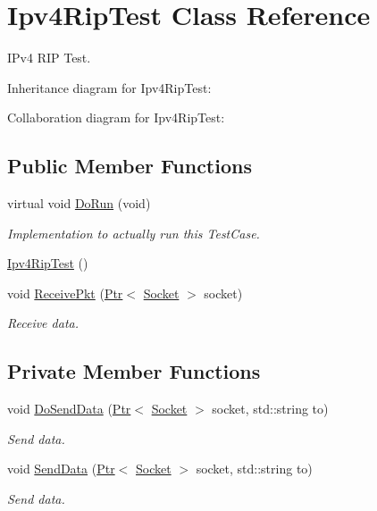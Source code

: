 \hypertarget{classIpv4RipTest}{}\section{Ipv4\+Rip\+Test Class Reference}
\label{classIpv4RipTest}


I\+Pv4 R\+IP Test.  




Inheritance diagram for Ipv4\+Rip\+Test\+:


Collaboration diagram for Ipv4\+Rip\+Test\+:
\subsection*{Public Member Functions}
\begin{DoxyCompactItemize}
\item 
virtual void \hyperlink{classIpv4RipTest_a4f355233f8793da9555cd544cd5893e9}{Do\+Run} (void)
\begin{DoxyCompactList}\small\item\em Implementation to actually run this Test\+Case. \end{DoxyCompactList}\item 
\hyperlink{classIpv4RipTest_a367e000c5525d4a858a52edfba893ebc}{Ipv4\+Rip\+Test} ()
\item 
void \hyperlink{classIpv4RipTest_a1675460149afb06855b867ff17f4a2a4}{Receive\+Pkt} (\hyperlink{classns3_1_1Ptr}{Ptr}$<$ \hyperlink{classns3_1_1Socket}{Socket} $>$ socket)
\begin{DoxyCompactList}\small\item\em Receive data. \end{DoxyCompactList}\end{DoxyCompactItemize}
\subsection*{Private Member Functions}
\begin{DoxyCompactItemize}
\item 
void \hyperlink{classIpv4RipTest_af38195cc9083fa17f5c25382bb42ce98}{Do\+Send\+Data} (\hyperlink{classns3_1_1Ptr}{Ptr}$<$ \hyperlink{classns3_1_1Socket}{Socket} $>$ socket, std\+::string to)
\begin{DoxyCompactList}\small\item\em Send data. \end{DoxyCompactList}\item 
void \hyperlink{classIpv4RipTest_a1542779d9b423f90f5d5adc7c91e28ba}{Send\+Data} (\hyperlink{classns3_1_1Ptr}{Ptr}$<$ \hyperlink{classns3_1_1Socket}{Socket} $>$ socket, std\+::string to)
\begin{DoxyCompactList}\small\item\em Send data. \end{DoxyCompactList}\end{DoxyCompactItemize}
